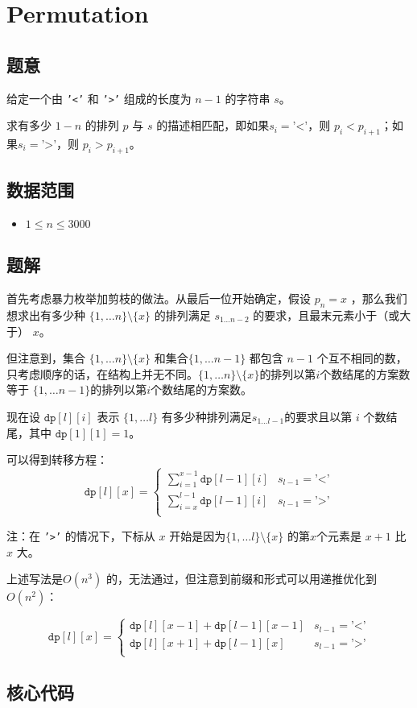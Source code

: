 \section{Permutation}
\subsection*{题意}
给定一个由 \texttt{'<'} 和 \texttt{'>'} 组成的长度为 $n-1$ 的字符串 $s$。

求有多少 $1-n$ 的排列 $p$ 与 $s$ 的描述相匹配，即如果$s_i = \texttt{'<'}$，则 $p_i < p_{i+1}$；如果$s_i = \texttt{'>'}$，则 $p_i > p_{i+1}$。

\subsection*{数据范围}
\begin{itemize}
\item $1 \leq n \leq 3000$
\end{itemize}

\subsection*{题解}


首先考虑暴力枚举加剪枝的做法。从最后一位开始确定，假设 $p_n = x$ ，那么我们想求出有多少种 $\{1,\ldots n\}\setminus \{x\}$ 的排列满足 $s_{1\ldots n-2}$ 的要求，且最末元素小于（或大于） $x$。 

但注意到，集合 $\{1,\ldots n\}\setminus \{x\}$ 和集合$\{1,\ldots n-1\}$ 都包含 $n-1$ 个互不相同的数，只考虑顺序的话，在结构上并无不同。$\{1,\ldots n\}\setminus \{x\}$的排列以第$i$个数结尾的方案数等于 $\{1,\ldots n-1\}$的排列以第$i$个数结尾的方案数。

现在设 $\texttt{dp}[l][i]$ 表示 $\{1,\ldots l\}$ 有多少种排列满足$s_{1\ldots l-1}$的要求且以第 $i$ 个数结尾，其中 $\texttt{dp}[1][1] = 1$。

可以得到转移方程：
$$
\texttt{dp}[l][x] = 
\begin{cases}
 \displaystyle\sum_{i = 1}^{x-1}\texttt{dp}[l-1][i] & s_{l-1} = \texttt{'<'}\\
 \displaystyle\sum_{i = x}^{l-1}\texttt{dp}[l-1][i] & s_{l-1} = \texttt{'>'}\\
\end{cases}
$$

注：在 \texttt{'>'} 的情况下，下标从 $x$ 开始是因为$\{1,\ldots l\}\setminus \{x\}$ 的第$x$个元素是 $x+1$ 比 $x$ 大。

上述写法是$O(n^3)$ 的，无法通过，但注意到前缀和形式可以用递推优化到 $O(n^2)$：

$$
\texttt{dp}[l][x] = 
\begin{cases}
\texttt{dp}[l][x-1] + \texttt{dp}[l-1][x-1] & s_{l-1} = \texttt{'<'}\\
\texttt{dp}[l][x+1] + \texttt{dp}[l-1][x] & s_{l-1} = \texttt{'>'}\\
\end{cases}
$$




\newpage
\subsection*{核心代码}


\inputminted[linenos,autogobble]{cpp}{./Code/T.cpp}
\newpage